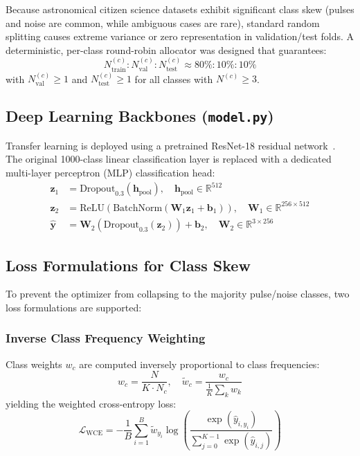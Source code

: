\documentclass[10pt,twocolumn]{article}
\begin{document}
Because astronomical citizen science datasets exhibit significant class skew (pulses and noise are common, while ambiguous cases are rare), standard random splitting causes extreme variance or zero representation in validation/test folds. A deterministic, per-class round-robin allocator was designed that guarantees:
\begin{equation}
    N_{\text{train}}^{(c)} : N_{\text{val}}^{(c)} : N_{\text{test}}^{(c)} \approx 80\% : 10\% : 10\%
\end{equation}
with $N_{\text{val}}^{(c)} \ge 1$ and $N_{\text{test}}^{(c)} \ge 1$ for all classes with $N^{(c)} \ge 3$.

\subsection{Deep Learning Backbones (\texttt{model.py})}
Transfer learning is deployed using a pretrained ResNet-18 residual network~\cite{he2016deep}. The original 1000-class linear classification layer is replaced with a dedicated multi-layer perceptron (MLP) classification head:
\begin{align}
    \mathbf{z}_1 &= \text{Dropout}_{0.3}(\mathbf{h}_{\text{pool}}), \quad \mathbf{h}_{\text{pool}} \in \mathbb{R}^{512} \\
    \mathbf{z}_2 &= \text{ReLU}\left(\text{BatchNorm}\left(\mathbf{W}_1 \mathbf{z}_1 + \mathbf{b}_1\right)\right), \quad \mathbf{W}_1 \in \mathbb{R}^{256 \times 512} \\
    \hat{\mathbf{y}} &= \mathbf{W}_2 (\text{Dropout}_{0.3}(\mathbf{z}_2)) + \mathbf{b}_2, \quad \mathbf{W}_2 \in \mathbb{R}^{3 \times 256}
\end{align}

\subsection{Loss Formulations for Class Skew}
To prevent the optimizer from collapsing to the majority pulse/noise classes, two loss formulations are supported:
\subsubsection{Inverse Class Frequency Weighting}
Class weights $w_c$ are computed inversely proportional to class frequencies:
\begin{equation}
    w_c = \frac{N}{K \cdot N_c}, \quad \tilde{w}_c = \frac{w_c}{\frac{1}{K}\sum_{k} w_k}
\end{equation}
yielding the weighted cross-entropy loss:
\begin{equation}
    \mathcal{L}_{\text{WCE}} = -\frac{1}{B} \sum_{i=1}^B \tilde{w}_{y_i} \log \left( \frac{\exp(\hat{y}_{i, y_i})}{\sum_{j=0}^{K-1} \exp(\hat{y}_{i, j})} \right)
\end{equation}
\end{document}
